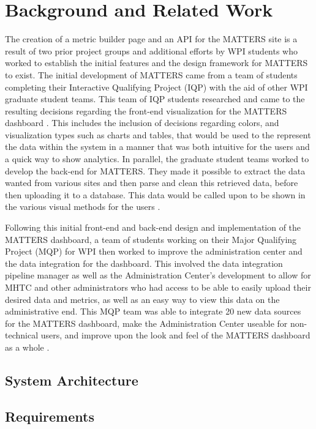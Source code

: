\chapter{Background and Related Work}

	The creation of a metric builder page and an API for the MATTERS site is a 
	result of two prior project groups and additional efforts by WPI students 
	who worked to establish the initial features and the design framework for 
	MATTERS to exist. The initial development of MATTERS came from a team of 
	students completing their Interactive Qualifying Project (IQP) with the 
	aid of other WPI graduate student teams. This team of IQP students researched 
	and came to the resulting decisions regarding the front-end visualization for 
	the MATTERS dashboard \cite{prevreport}. This includes the inclusion of decisions 
	regarding colors, and visualization types such as charts and tables, that would 
	be used to the represent the data within the system in a manner that was both 
	intuitive for the users and a quick way to show analytics. In parallel, 
	the graduate student teams worked to develop the back-end for MATTERS. 
	They made it possible to extract the data wanted from various sites and 
	then parse and clean this retrieved data, before then uploading it to a 
	database. This data would be called upon to be shown in the various visual 
	methods for the users \cite{iqp}.

	Following this initial front-end and back-end design and implementation 
	of the MATTERS dashboard, a team of students working on their Major Qualifying 
	Project (MQP) for WPI then worked to improve the administration center and the 
	data integration for the dashboard. This involved the data integration pipeline 
	manager as well as the Administration Center’s development to allow for MHTC 
	and other administrators who had access to be able to easily upload their 
	desired data and metrics, as well as an easy way to view this data on the 
	administrative end. This MQP team was able to integrate 20 new data sources 
	for the MATTERS dashboard, make the Administration Center useable for 
	non-technical users, and improve upon the look and feel of the MATTERS 
	dashboard as a whole \cite{iqp}.

	\section{System Architecture}

	\section{Requirements}

